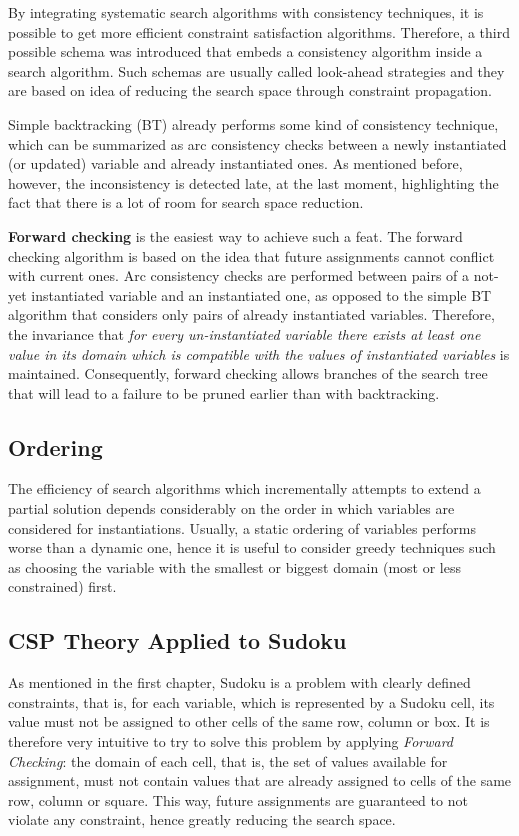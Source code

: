 By integrating systematic search algorithms with consistency techniques, it is possible to get more efficient constraint satisfaction algorithms. 
Therefore, a third possible schema was introduced that embeds a consistency algorithm inside a search algorithm. Such schemas are usually called look-ahead strategies and they are based on idea of reducing the search space through constraint propagation.
\par
Simple backtracking (BT) already performs some kind of consistency technique, which can be summarized as arc consistency checks between a newly instantiated (or updated) variable and already instantiated ones. As mentioned before, however, the inconsistency is detected late, at the last moment, highlighting the fact that there is a lot of room for search space reduction.
\par
\textbf{Forward checking} is the easiest way to achieve such a feat. The forward checking algorithm is based on the idea that future assignments cannot conflict with current ones. 
Arc consistency checks are performed between pairs of a not-yet instantiated variable and an instantiated one, as opposed to the simple BT algorithm that considers only pairs of already instantiated variables. Therefore, the invariance that \textit{for every un-instantiated variable there exists at least one value in its domain which is compatible with the values of instantiated variables} is maintained. Consequently, forward checking allows branches of the search tree that will lead to a failure to be pruned earlier than with backtracking.

\subsection{Ordering}

The efficiency of search algorithms which incrementally attempts to extend a partial solution depends considerably on the order in which variables are considered for instantiations. 
Usually, a static ordering of variables performs worse than a dynamic one, hence it is useful to consider greedy techniques such as choosing the variable with the smallest or biggest domain (most or less constrained) first.

\subsection{CSP Theory Applied to Sudoku}

As mentioned in the first chapter, Sudoku is a problem with clearly defined constraints, that is, for each variable, which is represented by a Sudoku cell, its value must not be assigned to other cells of the same row, column or box. It is therefore very intuitive to try to solve this problem by applying \textit{Forward Checking}: the domain of each cell, that is, the set of values available for assignment, must not contain values that are already assigned to cells of the same row, column or square. This way, future assignments are guaranteed to not violate any constraint, hence greatly reducing the search space.

